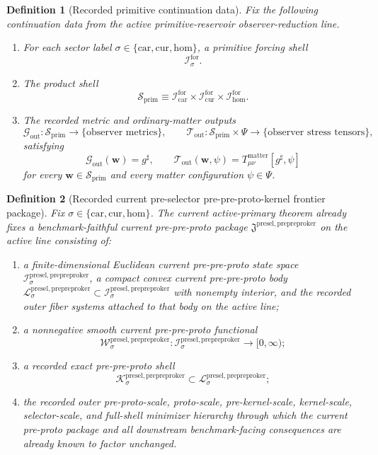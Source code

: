\documentclass[11pt]{article}
\newcommand{\CompletedMetric}{g^{\sharp}}
\newcommand{\MatterSpace}{\Psi}
\newcommand{\Car}{\mathrm{car}}
\newcommand{\Cur}{\mathrm{cur}}
\newcommand{\Hom}{\mathrm{hom}}
\newcommand{\ForSpace}[1]{\mathcal I_{#1}^{\mathrm{for}}}
\newcommand{\PrimShell}{\mathcal S_{\mathrm{prim}}}
\newcommand{\MetricOut}{\mathscr G_{\mathrm{out}}}
\newcommand{\MatterOut}{\mathscr T_{\mathrm{out}}}
\newcommand{\PrePreProtoKernelPackage}{\mathfrak J^{\mathrm{presel,prepreproker}}}
\newcommand{\PrePreProtoKernelSpace}[1]{\mathcal I_{#1}^{\mathrm{presel,prepreproker}}}
\newcommand{\PrePreProtoKernelBody}[1]{\mathcal L_{#1}^{\mathrm{presel,prepreproker}}}
\newcommand{\PrePreProtoKernelFunctional}[1]{\mathscr W_{#1}^{\mathrm{presel,prepreproker}}}
\newcommand{\PrePreProtoKernelShell}[1]{\mathcal K_{#1}^{\mathrm{presel,prepreproker}}}
\newtheorem{definition}{Definition}
\begin{document}
\begin{definition}[Recorded primitive continuation data]
\label{def:fixed}
Fix the following continuation data from the active primitive-reservoir observer-reduction line.
\begin{enumerate}
    \item For each sector label \(\sigma\in\{\Car,\Cur,\Hom\}\), a primitive forcing shell
    \[
    \ForSpace{\sigma}.
    \]
    \item The product shell
    \[
    \PrimShell
    \equiv
    \ForSpace{\Car}\times \ForSpace{\Cur}\times \ForSpace{\Hom}.
    \]
    \item The recorded metric and ordinary-matter outputs
    \[
    \MetricOut:\PrimShell\to\{\text{observer metrics}\},
    \qquad
    \MatterOut:\PrimShell\times\MatterSpace\to\{\text{observer stress tensors}\},
    \]
    satisfying
    \begin{equation}
    \MetricOut(\mathbf w)=\CompletedMetric,
    \qquad
    \MatterOut(\mathbf w,\psi)
    =
    T_{\mu\nu}^{\mathrm{matter}}[\CompletedMetric,\psi]
    \label{eq:fixedoutputs}
    \end{equation}
    for every \(\mathbf w\in\PrimShell\) and every matter configuration \(\psi\in\MatterSpace\).
\end{enumerate}
\end{definition}

\begin{definition}[Recorded current pre-selector pre-pre-proto-kernel frontier package]
\label{def:frontier}
Fix \(\sigma\in\{\Car,\Cur,\Hom\}\). The current active-primary theorem already fixes a benchmark-faithful current pre-pre-proto package \(\PrePreProtoKernelPackage\) on the active line consisting of:
\begin{enumerate}
    \item a finite-dimensional Euclidean current pre-pre-proto state space \(\PrePreProtoKernelSpace{\sigma}\), a compact convex current pre-pre-proto body \(\PrePreProtoKernelBody{\sigma}\subset\PrePreProtoKernelSpace{\sigma}\) with nonempty interior, and the recorded outer fiber systems attached to that body on the active line;
    \item a nonnegative smooth current pre-pre-proto functional
    \[
    \PrePreProtoKernelFunctional{\sigma}:\PrePreProtoKernelSpace{\sigma}\to[0,\infty);
    \]
    \item a recorded exact pre-pre-proto shell
    \[
    \PrePreProtoKernelShell{\sigma}\subset\PrePreProtoKernelBody{\sigma};
    \]
    \item the recorded outer pre-proto-scale, proto-scale, pre-kernel-scale, kernel-scale, selector-scale, and full-shell minimizer hierarchy through which the current pre-proto package and all downstream benchmark-facing consequences are already known to factor unchanged.
\end{enumerate}
\end{definition}
\end{document}
